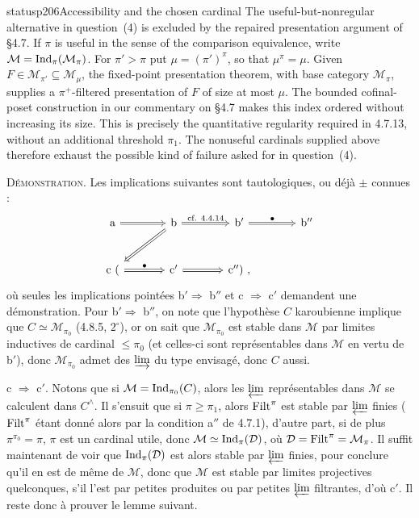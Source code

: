 \begin{dcomment}{status}{p206}{Accessibility and the chosen cardinal}
The useful-but-nonregular alternative in question~(4) is excluded by the repaired presentation argument of \S4.7. If $\pi$ is useful in the sense of the comparison equivalence, write $\mathcal M=\operatorname{Ind}_\pi(\mathcal M_\pi)$. For $\pi'>\pi$ put $\mu=(\pi')^\pi$, so that $\mu^\pi=\mu$. Given $F\in\mathcal M_{\pi'}\subseteq\mathcal M_\mu$, the fixed-point presentation theorem, with base category $\mathcal M_\pi$, supplies a $\pi^+$-filtered presentation of $F$ of size at most $\mu$. The bounded cofinal-poset construction in our commentary on \S4.7 makes this index ordered without increasing its size. This is precisely the quantitative regularity required in 4.7.13, without an additional threshold $\pi_1$. The nonuseful cardinals supplied above therefore exhaust the possible kind of failure asked for in question~(4).
\end{dcomment}


\textsc{Démonstration.} Les implications suivantes sont tautologiques, ou déjà $\pm$ connues :
\[
\begin{tikzcd}[column sep=large, row sep=large]
\mathrm{a} \arrow[r, Rightarrow] & \mathrm{b} \arrow[r, Rightarrow, "\text{cf. 4.4.14}"] \arrow[dl, Rightarrow] & \mathrm{b}' \arrow[r, Rightarrow, "\bullet"] & \mathrm{b}'' \\
\mathrm{c}\ ( \arrow[r, Rightarrow, "\bullet"] & \mathrm{c}' \arrow[r, Rightarrow] & \mathrm{c}'')\ , &
\end{tikzcd}
\]
où seules les implications pointées b$'\Longrightarrow$ b$''$ et c $\Longrightarrow$ c$'$ demandent une démonstration. Pour b$'\Longrightarrow$ b$''$, on note que l'hypothèse $C$ karoubienne implique que $C\simeq\mathcal{M}_{\pi_0}$ (4.8.5, $2^\circ$), or on sait que $\mathcal{M}_{\pi_0}$ est stable dans $\mathcal{M}$ par limites inductives de cardinal $\leqslant\pi_0$ (et celles-ci sont représentables dans $\mathcal{M}$ en vertu de b$'$), donc $\mathcal{M}_{\pi_0}$ admet des $\varinjlim$ du type envisagé, donc $C$ aussi.

c $\Longrightarrow$ c$'$. Notons que si $\mathcal{M}=\operatorname{Ind}_{\pi_0}(C)$, alors les $\varprojlim$ représentables dans $\mathcal{M}$ se calculent dans $C^\wedge$. Il s'ensuit que si $\pi\geqslant\pi_1$, alors $\mathrm{Filt}^\pi$ est stable par $\varprojlim$ finies ($\mathrm{Filt}^\pi$ étant donné alors par la condition a$''$ de 4.7.1), d'autre part, si de plus $\pi^{\pi_0}=\pi$, $\pi$ est un cardinal utile, donc $\mathcal{M}\simeq\operatorname{Ind}_\pi(\mathcal{D})$, où $\mathcal{D}=\mathrm{Filt}^\pi=\mathcal{M}_\pi$. Il suffit maintenant de voir que $\operatorname{Ind}_\pi(\mathcal{D})$ est alors stable par $\varprojlim$ finies, pour conclure qu'il en est de même de $\mathcal{M}$, donc que $\mathcal{M}$ est stable par limites projectives quelconques, s'il l'est par petites produites ou par petites $\varprojlim$ filtrantes, d'où c$'$. Il reste donc à prouver le lemme suivant. %

